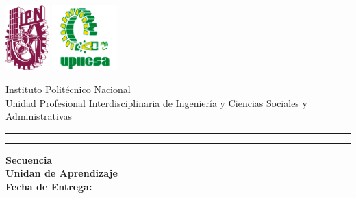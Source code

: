 \begin{titlepage}
  \thispagestyle{empty}
  \vspace*{\fill} %

  \begin{center}
    \includegraphics[height=2.5cm]{portada/images/logo-poliguinda-pantone222.png}
    \hfill
    \includegraphics[height=2.5cm]{portada/images/upiicsa.png}

    \vspace{1cm}

    {\large Instituto Politécnico Nacional} \\
    {\large Unidad Profesional Interdisciplinaria de Ingeniería y Ciencias Sociales y Administrativas}

    \vspace{0.5cm}
    {\color{black}\rule{\textwidth}{3pt}}
    {\color{black}\rule{\textwidth}{2pt}}

    \vspace{2cm}

    {\Large \textbf{\thetitle}}

    \vspace{1cm}
    {\large\textsc{\theauthor}}

    \vspace{1cm}

    \textbf{Secuencia} \grupo\\
    \textbf{Unidan de Aprendizaje} \asignatura\\
    \textbf{Fecha de Entrega:} \fechaEntrega
  \end{center}

  \vspace*{\fill} %
\end{titlepage}
